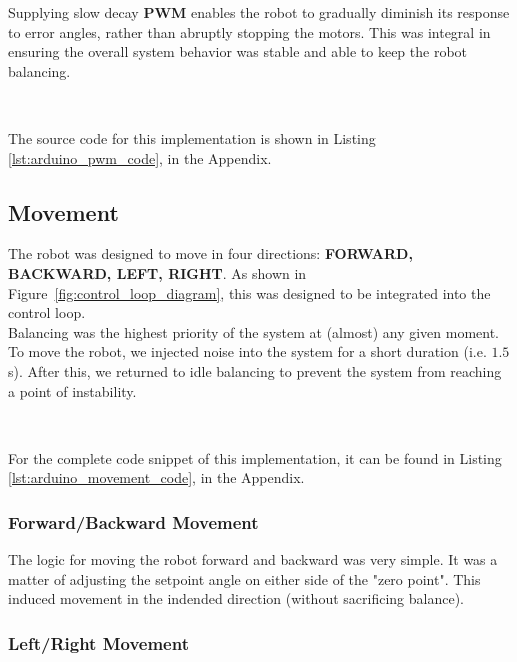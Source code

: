 \documentclass{article}
\begin{document}
\begin{minipage}{\linewidth}
    Supplying slow decay \textbf{PWM} enables the robot to gradually diminish its response to error angles, rather than abruptly stopping the motors.
    This was integral in ensuring the overall system behavior was stable and able to keep the robot balancing.

    \

    The source code for this implementation is shown in Listing \ref{lst:arduino_pwm_code}, in the Appendix.
\end{minipage}

\subsection{Movement}
\label{sec:movement}

\begin{minipage}{\linewidth}
    The robot was designed to move in four directions: \textbf{FORWARD, BACKWARD, LEFT, RIGHT}.
    As shown in Figure~\ref{fig:control_loop_diagram}, this was designed to be integrated into the control loop.  \\

    Balancing was the highest priority of the system at (almost) any given moment. To move the robot, we injected noise into the system for a short duration
    (i.e. $1.5$ s). After this, we returned to idle balancing to prevent the system from reaching a point of instability.

    \

    For the complete code snippet of this implementation, it can be found in Listing \ref{lst:arduino_movement_code}, in the Appendix.
\end{minipage}

\subsubsection{Forward/Backward Movement}

\begin{minipage}{\linewidth}
    The logic for moving the robot forward and backward was very simple. It was a matter of adjusting the setpoint angle on either side of the "zero point".
    This induced movement in the indended direction (without sacrificing balance). \\
\end{minipage}

\subsubsection{Left/Right Movement}
\end{document}
